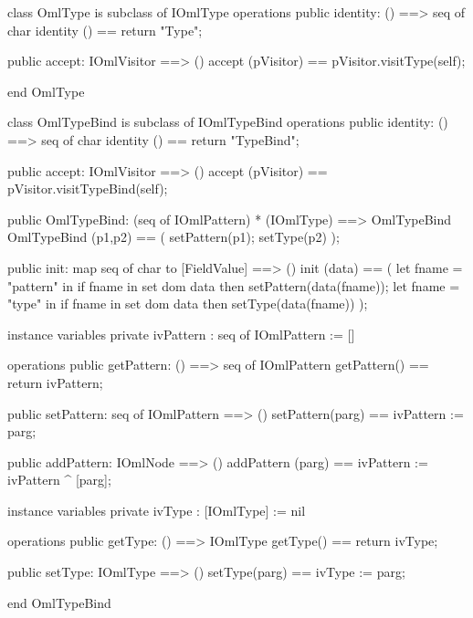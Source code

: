 \begin{vdm_al}
class OmlType is subclass of IOmlType
operations
  public identity: () ==> seq of char
  identity () == return "Type";

  public accept: IOmlVisitor ==> ()
  accept (pVisitor) == pVisitor.visitType(self);

end OmlType
\end{vdm_al}
\begin{vdm_al}
class OmlTypeBind is subclass of IOmlTypeBind
operations
  public identity: () ==> seq of char
  identity () == return "TypeBind";

  public accept: IOmlVisitor ==> ()
  accept (pVisitor) == pVisitor.visitTypeBind(self);

  public OmlTypeBind:
      (seq of IOmlPattern) *
      (IOmlType) ==> OmlTypeBind
  OmlTypeBind (p1,p2) == 
   ( setPattern(p1);
     setType(p2) );

  public init: map seq of char to [FieldValue] ==> ()
  init (data) ==
    ( let fname = "pattern" in
        if fname in set dom data
        then setPattern(data(fname));
      let fname = "type" in
        if fname in set dom data
        then setType(data(fname)) );

instance variables
  private ivPattern : seq of IOmlPattern := []

operations
  public getPattern: () ==> seq of IOmlPattern
  getPattern() == return ivPattern;

  public setPattern: seq of IOmlPattern ==> ()
  setPattern(parg) == ivPattern := parg;

  public addPattern: IOmlNode ==> ()
  addPattern (parg) == ivPattern := ivPattern ^ [parg];

instance variables
  private ivType : [IOmlType] := nil

operations
  public getType: () ==> IOmlType
  getType() == return ivType;

  public setType: IOmlType ==> ()
  setType(parg) == ivType := parg;

end OmlTypeBind
\end{vdm_al}

